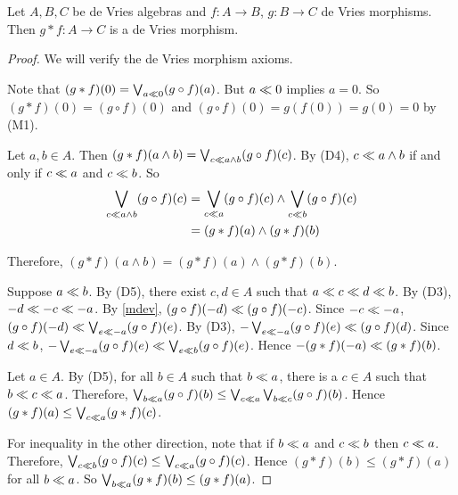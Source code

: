 \begin{proposition}
	\label{mcompmorphism}
	Let \( A,B,C \) be de Vries algebras and \( f:A \to B \), \( g:B \to C \) de Vries morphisms.  Then \( g \ast f: A \to C \) is a de Vries morphism.
\end{proposition}
\begin{proof}
	We will verify the de Vries morphism axioms.
	
		Note that \( (g \ast f)(0) = \bigvee_{a \ll 0} (g \circ f)(a) \).  But \( a \ll 0 \) implies \( a = 0 \).  So \( (g \ast f)(0) = (g \circ f)(0) \) and \( (g \circ f)(0) = g(f(0)) = g(0) = 0 \) by (M1).
	
		Let \( a,b \in A \).  Then \( (g \ast f)(a \wedge b) = \bigvee_{c \ll a \wedge b} (g \circ f)(c) \).  By (D4), \( c \ll a \wedge b \) if and only if \( c \ll a \) and \( c \ll b \).  So
		\begin{align*}
			\bigvee_{c \ll a \wedge b} (g \circ f)(c) &= \bigvee_{c \ll a} (g \circ f)(c) \wedge \bigvee_{c \ll b} (g \circ f)(c) \\
			&= (g \ast f)(a) \wedge (g \ast f)(b)
		\end{align*}
		
		Therefore, \( (g \ast f)(a \wedge b) = (g \ast f)(a) \wedge (g \ast f)(b) \).
	
		Suppose \( a \ll b \).  By (D5), there exist \( c,d \in A \) such that \( a \ll c \ll d \ll b \).  By (D3), \( -d \ll -c \ll -a \).  By \ref{mdev}, \( (g \circ f)(-d) \ll (g \circ f)(-c) \).  Since \( -c \ll -a \), \( (g \circ f)(-d) \ll \bigvee_{e \ll -a} (g \circ f)(e) \).  By (D3), \( -\bigvee_{e \ll -a} (g \circ f)(e) \ll (g \circ f)(d) \).  Since \( d \ll b \), \( -\bigvee_{e \ll -a} (g \circ f)(e) \ll \bigvee_{e \ll b} (g \circ f)(e) \).  Hence \( -(g \ast f)(-a) \ll (g \ast f)(b) \).
		
		Let \( a \in A \).  By (D5), for all \( b \in A \) such that \( b \ll a \), there is a \( c \in A \) such that \( b \ll c \ll a \).  Therefore, \( \bigvee_{b \ll a} (g \circ f)(b) \leq \bigvee_{c \ll a} \bigvee_{b \ll c} (g \circ f)(b) \).  Hence \( (g \ast f)(a) \leq \bigvee_{c \ll a} (g \ast f)(c) \).
		
		For inequality in the other direction, note that if \( b \ll a \) and \( c \ll b \) then \( c \ll a \).  Therefore, \( \bigvee_{c \ll b} (g \circ f)(c) \leq \bigvee_{c \ll a} (g \circ f)(c) \).  Hence \( (g \ast f)(b) \leq (g \ast f)(a) \) for all \( b \ll a \).  So \( \bigvee_{b \ll a} (g \ast f)(b) \leq (g \ast f)(a) \).
\end{proof}

